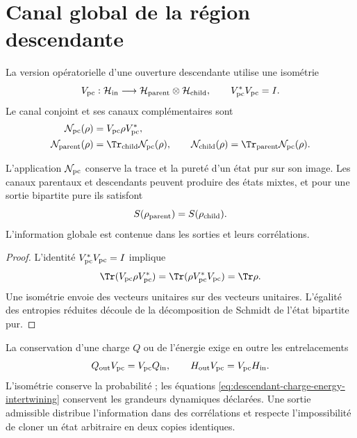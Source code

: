 \section{Canal global de la région descendante}

La version opératorielle d'une ouverture descendante utilise une isométrie
\begin{equation}
 V_{\rm pc}:\mathcal H_{\rm in}\longrightarrow
 \mathcal H_{\rm parent}\otimes\mathcal H_{\rm child},
 \qquad
 V_{\rm pc}^*V_{\rm pc}=I.
 \label{eq:descendant-parent-child-isometry}
\end{equation}
Le canal conjoint et ses canaux complémentaires sont
\begin{align}
 \mathcal N_{\rm pc}(\rho)
 &=V_{\rm pc}\rho V_{\rm pc}^*,
 \label{eq:descendant-global-channel}\\
 \mathcal N_{\rm parent}(\rho)
 &=\Tr_{\rm child}\mathcal N_{\rm pc}(\rho),
 \qquad
 \mathcal N_{\rm child}(\rho)
 =\Tr_{\rm parent}\mathcal N_{\rm pc}(\rho).
 \label{eq:descendant-complementary-channels}
\end{align}

\begin{theorem}
\label{thm:descendant-global-conservation}
L'application \(\mathcal N_{\rm pc}\) conserve la trace et la pureté d'un état
pur sur son image. Les canaux parentaux et descendants peuvent produire des
états mixtes, et pour une sortie bipartite pure ils satisfont
\begin{equation}
 S(\rho_{\rm parent})=S(\rho_{\rm child}).
 \label{eq:descendant-equal-entanglement}
\end{equation}
L'information globale est contenue dans les sorties et leurs corrélations.
\end{theorem}

\begin{proof}
L'identité \(V_{\rm pc}^*V_{\rm pc}=I\) implique
\[
 \Tr(V_{\rm pc}\rho V_{\rm pc}^*)
 =\Tr(\rho V_{\rm pc}^*V_{\rm pc})=\Tr\rho.
\]
Une isométrie envoie des vecteurs unitaires sur des vecteurs unitaires. L'égalité des
entropies réduites découle de la décomposition de Schmidt de l'état
bipartite pur.
\end{proof}

La conservation d'une charge \(Q\) ou de l'énergie exige en outre les
entrelacements
\begin{equation}
 Q_{\rm out}V_{\rm pc}=V_{\rm pc}Q_{\rm in},
 \qquad
 H_{\rm out}V_{\rm pc}=V_{\rm pc}H_{\rm in}.
 \label{eq:descendant-charge-energy-intertwining}
\end{equation}
L'isométrie conserve la probabilité ; les équations
\cref{eq:descendant-charge-energy-intertwining} conservent les grandeurs
dynamiques déclarées. Une sortie admissible distribue l'information dans des
corrélations et respecte l'impossibilité de cloner un état arbitraire en
deux copies identiques.

